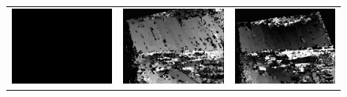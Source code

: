 \documentclass[11pt]{report}
\begin{document}
\begin{figure}[H]
\begin{tabular}{ccc}
    \includegraphics[scale=0.1]{images/disparity-opencv-t/disparity_11.png} &
    \includegraphics[scale=0.1]{images/disparity-opencv-d/disparity_11.png} &
    \includegraphics[scale=0.1]{images/disparity-opengv/disparity_11.png} \\

\end{tabular}
\end{figure}
\end{document}
